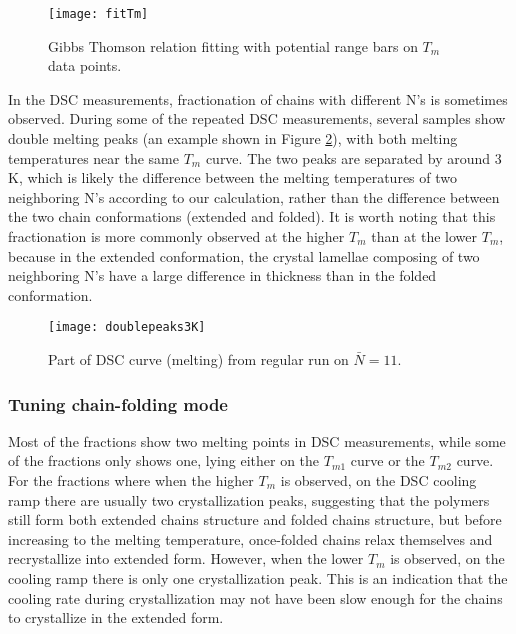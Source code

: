 \begin{figure}[H]
\center
\vspace{1 cm}
\texttt{[image: fitTm]}
\caption{Gibbs Thomson relation fitting with potential range bars on $T_{m}$ data points.}
\label{fig:fitTm}
\end{figure}

In the DSC measurements, fractionation of chains with different N's is sometimes observed. During some of the repeated DSC measurements, several samples show double melting peaks (an example shown in Figure \ref{fig:3K difference}), with both melting temperatures near the same $T_{m}$ curve. The two peaks are separated by around 3 K, which is likely the difference between the melting temperatures of two neighboring N's according to our calculation, rather than the difference between the two chain conformations (extended and folded). It is worth noting that this fractionation is more commonly observed at the higher $T_{m}$ than at the lower $T_{m}$, because in the extended conformation, the crystal lamellae composing of two neighboring N's have a large difference in thickness than in the folded conformation.

\begin{figure}[H]
	\center
	\vspace{1 cm}
	\texttt{[image: doublepeaks3K]}
	\caption{Part of DSC curve (melting) from regular run on $\bar{N} = 11$.}
	\label{fig:3K difference}
\end{figure}

\subsubsection{Tuning chain-folding mode}

Most of the fractions show two melting points in DSC measurements, while some of the fractions only shows one, lying either on the $T_{m1}$ curve or the $T_{m2}$ curve. For the fractions where when the higher $T_{m}$ is observed, on the DSC cooling ramp there are usually two crystallization peaks, suggesting that the polymers still form both extended chains structure and folded chains structure, but before increasing to the melting temperature, once-folded chains relax themselves and recrystallize into extended form. However, when the lower $T_{m}$ is observed, on the cooling ramp there is only one crystallization peak. This is an indication that the cooling rate during crystallization may not have been slow enough for the chains to crystallize in the extended form.

